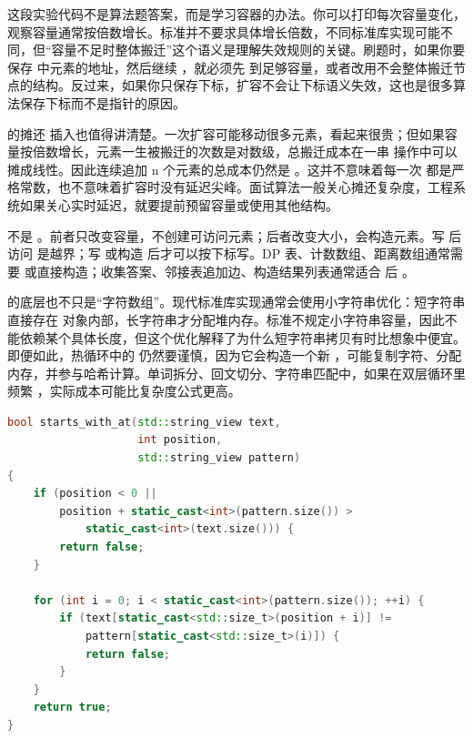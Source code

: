 这段实验代码不是算法题答案，而是学习容器的办法。你可以打印每次容量变化，观察容量通常按倍数增长。标准并不要求具体增长倍数，不同标准库实现可能不同，但“容量不足时整体搬迁”这个语义是理解失效规则的关键。刷题时，如果你要保存  中元素的地址，然后继续 ，就必须先  到足够容量，或者改用不会整体搬迁节点的结构。反过来，如果你只保存下标，扩容不会让下标语义失效，这也是很多算法保存下标而不是指针的原因。

 的摊还  插入也值得讲清楚。一次扩容可能移动很多元素，看起来很贵；但如果容量按倍数增长，元素一生被搬迁的次数是对数级，总搬迁成本在一串  操作中可以摊成线性。因此连续追加 n 个元素的总成本仍然是 。这并不意味着每一次  都是严格常数，也不意味着扩容时没有延迟尖峰。面试算法一般关心摊还复杂度，工程系统如果关心实时延迟，就要提前预留容量或使用其他结构。

\begin{warningbox}
 不是 。前者只改变容量，不创建可访问元素；后者改变大小，会构造元素。写  后访问  是越界；写  或构造  后才可以按下标写。DP 表、计数数组、距离数组通常需要  或直接构造；收集答案、邻接表追加边、构造结果列表通常适合  后 。
\end{warningbox}

 的底层也不只是“字符数组”。现代标准库实现通常会使用小字符串优化：短字符串直接存在  对象内部，长字符串才分配堆内存。标准不规定小字符串容量，因此不能依赖某个具体长度，但这个优化解释了为什么短字符串拷贝有时比想象中便宜。即便如此，热循环中的  仍然要谨慎，因为它会构造一个新 ，可能复制字符、分配内存，并参与哈希计算。单词拆分、回文切分、字符串匹配中，如果在双层循环里频繁 ，实际成本可能比复杂度公式更高。

\begin{lstlisting}[language=C++,caption={用 string\_view 表达非拥有子串视图}]
bool starts_with_at(std::string_view text,
                    int position,
                    std::string_view pattern)
{
    if (position < 0 ||
        position + static_cast<int>(pattern.size()) >
            static_cast<int>(text.size())) {
        return false;
    }

    for (int i = 0; i < static_cast<int>(pattern.size()); ++i) {
        if (text[static_cast<std::size_t>(position + i)] !=
            pattern[static_cast<std::size_t>(i)]) {
            return false;
        }
    }
    return true;
}
\end{lstlisting}

